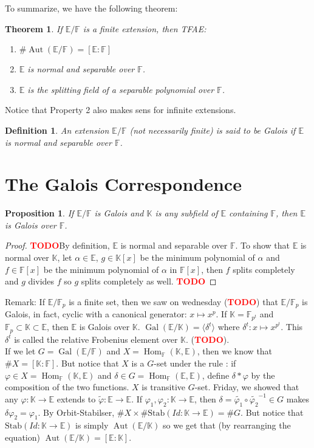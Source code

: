 \documentclass{article}
\newtheorem*{theorem}{Theorem}
\newtheorem*{proposition}{Proposition}
\newtheorem*{definition}{Definition}
\newcommand{\F}{\mathbb{F}}
\newcommand{\E}{\mathbb{E}}
\newcommand{\K}{\mathbb{K}}
\DeclareMathOperator{\Aut}{\text{Aut}}
\DeclareMathOperator{\Hom}{\text{Hom}}
\DeclareMathOperator{\Gal}{\text{Gal}}
\newcommand{\td}{\textcolor{red}{\textbf{TODO}}}
\begin{document}
To summarize, we have the following theorem:

\begin{theorem}
    If $\E / \F$ is a finite extension, then TFAE:
    \begin{enumerate}
        \item $\# \Aut(\E / \F) = [\E : \F]$
        \item $\E$ is normal and separable over $\F$.
        \item $\E$ is the splitting field of a separable polynomial over $\F$.
    \end{enumerate}
\end{theorem}

Notice that Property 2 also makes sens for infinite extensions.

\begin{definition}
    An extension  $\E / \F$ (not necessarily finite) is said to be Galois if $\E$ is normal and separable over $\F$.
\end{definition}

\section{The Galois Correspondence}

\begin{proposition}
    If $\E / \F$ is Galois and $\K$ is any subfield of $\E$ containing $\F$, then $\E$ is Galois over $\F$.
\end{proposition}

\begin{proof}
    \td By definition, $\E$ is normal and separable over $\F$. To show that $\E$ is normal over $\K$, let $\alpha \in \E$, $g \in \K[x]$ be the minimum polynomial of $\alpha$ and $f \in \F[x]$ be the minimum polynomial of $\alpha$ in $\F[x]$, then $f$ splits completely and $g$ divides $f$ so $g$ splits completely as well. \td
\end{proof}

Remark: If $\E / \F_p$ is a finite set, then we saw on wednesday (\td) that $\E / \F_p$ is Galois, in fact, cyclic with a canonical generator: $x \mapsto x^p$. If $\K = \F_{p^t}$ and $\F_p \subset \K \subset \E$, then $\E$ is Galois over $\K$. $\Gal(\E / \K) = \langle \delta^t \rangle$ where $\delta^t : x \mapsto x^{p^t}$. This $\delta^t$ is called the relative Frobenius element over $\K$. (\td).\\

If we let $G = \Gal(\E / \F)$ and $X = \Hom_{\F}(\K, \E)$, then we know that $\# X = [\K : \F]$. But notice that $X$ is a $G$-set under the rule : if $\varphi \in X = \Hom_{\F}(\K, \E)$ and $\delta \in G = \Hom_{\F}(\E, \E)$, define $\delta * \varphi$ by the composition of the two functions. $X$ is transitive $G$-set. Friday, we showed that any $\varphi : \K \to \E$ extends to $\tilde{\varphi} : \E \to \E$. If $\varphi_1, \varphi_2 : \K \to \E$, then $\delta = \tilde{\varphi_1} \circ \tilde{\varphi_2}^{-1} \in G$ makes $\delta \varphi_2 = \varphi_1$. By Orbit-Stabilser, $\# X \times \# \text{Stab}(Id : \K \to \E) = \# G$. But notice that $\text{Stab}(Id : \K \to \E)$ is simply $\Aut(\E / \K)$ so we get that (by rearranging the equation) $\Aut(\E / \K) = [\E : \K]$.
\end{document}
